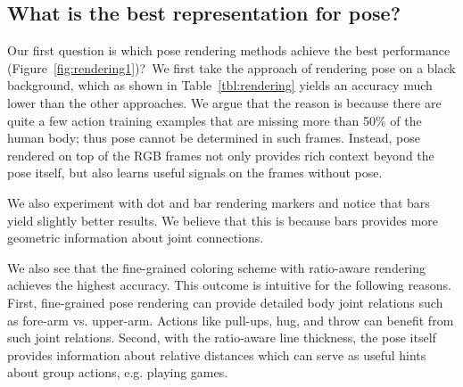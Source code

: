 \documentclass[letterpaper]{article} \usepackage{aaai21}  \usepackage{times}  \usepackage{helvet} \usepackage{courier}  \usepackage[hyphens]{url}  \usepackage{graphicx} \urlstyle{rm} \def\UrlFont{\rm}  \usepackage{natbib}  \usepackage{caption} \frenchspacing  \setlength{\pdfpagewidth}{8.5in}  \setlength{\pdfpageheight}{11in}
\begin{document}
\subsection{What is the best representation for  pose?}
\label{exp:pose_rendering}




Our first question is which pose rendering methods achieve the best performance (Figure~\ref{fig:rendering1})?\
We first take the approach of rendering pose on a black background, which as shown in Table~\ref{tbl:rendering} yields an accuracy much lower than the other approaches. 
We argue that the reason is because there are quite a few action training examples that are missing more than 50\% of the human body; thus pose cannot be determined in such frames. Instead, pose rendered on top of the RGB frames not only provides rich context beyond the pose itself, but also learns useful signals on the frames without pose. 

We also experiment with dot and bar rendering markers and notice that bars yield slightly better results.   We believe that this is because bars provides more geometric information about joint connections.

We also see that the fine-grained coloring scheme with ratio-aware rendering achieves the highest accuracy. This outcome is intuitive for the following reasons. First, fine-grained pose rendering can provide detailed body joint relations such as fore-arm vs. upper-arm. Actions like pull-ups, hug, and throw can benefit from such joint relations. Second, with the ratio-aware line thickness, the pose itself provides information about relative distances which can serve as useful hints about group actions, e.g. playing games. 
\end{document}
